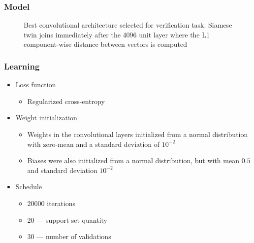 \documentclass[xetex,mathserif,serif]{beamer}
\begin{document}
	\begin{frame}
		\frametitle{Model}
    		\begin{figure}[h]
                \caption{Best convolutional architecture selected for verification task. Siamese twin joins immediately after the 4096 unit layer where the L1 component-wise distance between vectors is computed}
                \label{fig:image}
            \end{figure}
	\end{frame}	
	
	\begin{frame}
		\frametitle{Learning}
			\begin{itemize}
		 		\item Loss function
        			\begin{itemize}
        		 		\item Regularized cross-entropy
        			\end{itemize}
        		\item Weight initialization
        			\begin{itemize}
        		 		\item Weights in the convolutional layers initialized from a normal distribution with zero-mean and a standard deviation of $10^{-2}$
        		 		\item Biases were also initialized from a normal distribution, but with mean $0.5$ and standard deviation $10^{-2}$
        			\end{itemize}
        		\item Schedule
        			\begin{itemize}
        		 		\item $20000$ iterations
        		 		\item $20$ — support set quantity
        		 		\item $30$ — number of validations
        			\end{itemize}
			\end{itemize}
	\end{frame}	
	
\end{document}
